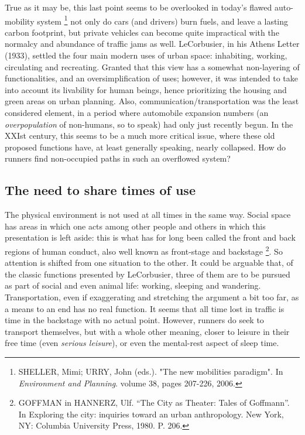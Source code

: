 True as it may be, this last point seems to be overlooked in today's flawed auto-mobility system%
\footnote{SHELLER, Mimi; URRY, John (eds.). "The new mobilities paradigm". In \textit{Environment and Planning}. volume 38, pages 207-226, 2006.
}
not only do cars (and drivers) burn fuels, and leave a lasting carbon footprint, but  private vehicles can become  quite impractical with the normalcy and abundance of traffic jams as well. LeCorbusier, in his Athens Letter (1933), settled the four main modern uses of urban space: inhabiting, working, circulating and recreating. Granted that this view has a somewhat non-layering of
functionalities, and an oversimplification of uses; however, it was intended to take into account its livability for human beings, hence prioritizing the housing and green areas on urban planning. Also, communication/transportation was the least considered element, in a period where automobile expansion numbers (an \textit{overpopulation} of non-humans, so to speak) had only just recently begun. In the XXIst  century, this seems to be a much more critical issue, where these old proposed functions have, at least generally speaking, nearly collapsed. How do runners find non-occupied paths in such an overflowed system?

\subsection*{The need to share times of use}

The physical environment is not used at all times in the same way. Social space has areas in which one acts among other people and others in which this presentation is left aside: this is what has for long been called the front and back regions of human conduct, also well known as front-stage and backstage%
\footnote{GOFFMAN in HANNERZ, Ulf. “The City as Theater: Tales of Goffmann”. In Exploring the city: inquiries toward an urban anthropology. New York, NY: Columbia University Press, 1980. P. 206.}.
So attention is shifted from one situation to the other. It could be arguable that, of the classic functions presented by LeCorbusier, three of them are to be pursued as part of social and even animal life: working, sleeping and wandering. Transportation, even if exaggerating and stretching the argument a bit too far, as a means to an end has no real function. It seems that all time lost in traffic is time in the backstage with no actual point. However, runners do seek to transport themselves, but with a whole other meaning, closer to leisure in their free time (even \textit{serious leisure}), or even the mental-rest aspect of sleep time.
